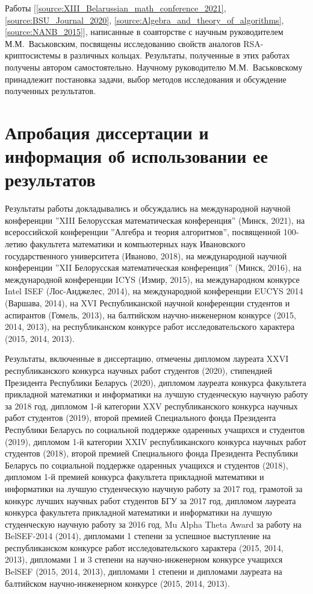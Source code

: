 \documentclass[_00_dissertation.tex]{subfiles}
\begin{document}
Работы [\ref{source:XIII_Belarussian_math_conference_2021}, \ref{source:BSU_Journal_2020}, \ref{source:Algebra_and_theory_of_algorithms}, \ref{source:NANB_2015}], написанные в соавторстве с научным руководителем М.М.~Васьковским, посвящены исследованию свойств аналогов RSA-криптосистемы в различных кольцах.
Результаты, полученные  в этих работах получены  автором самостоятельно.
Научному руководителю М.М.~Васьковскому принадлежит постановка задачи, выбор методов исследования и обсуждение полученных результатов.

\section*{Апробация диссертации и информация об использовании ее результатов}

Результаты работы докладывались и обсуждались на международной научной конференции ''XIII Белорусская математическая конференция'' (Минск, 2021), на всероссийской конференции ''Алгебра и теория алгоритмов'', посвященной 100-летию факультета математики и компьютерных наук Ивановского государственного университета (Иваново, 2018), на международной научной конференции ''XII Белорусская математическая конференция'' (Минск, 2016), на международной конференции ICYS (Измир, 2015), на международном конкурсе Intel ISEF (Лос-Анджелес, 2014), на международной конференции EUCYS 2014 (Варшава, 2014), на XVI Республиканской научной конференции студентов и аспирантов (Гомель, 2013), на балтийском научно-инженерном конкурсе (2015, 2014, 2013), на республиканском конкурсе работ исследовательского характера (2015, 2014, 2013).

Результаты, включенные в диссертацию, отмечены дипломом лауреата XXVI республиканского конкурса научных работ студентов (2020), стипендией Президента Республики Беларусь (2020), дипломом лауреата конкурса факультета прикладной математики и информатики на лучшую студенческую научную работу за 2018 год, дипломом 1-й категории XXV республиканского конкурса научных работ студентов (2019), второй премией Специального фонда Президента Республики Беларусь по социальной поддержке одаренных учащихся и студентов (2019), дипломом 1-й категории XXIV республиканского конкурса научных работ студентов (2018), второй премией Специального фонда Президента Республики Беларусь по социальной поддержке одаренных учащихся и студентов (2018), дипломом 1-й премией конкурса факультета прикладной математики и информатики на лучшую студенческую научную работу за 2017 год, грамотой за конкурс лучших научных работ студентов БГУ за 2017 год, дипломом лауреата конкурса факультета прикладной математики и информатики на лучшую студенческую научную работу за 2016 год, Mu Alpha Theta Award за работу на BelSEF-2014 (2014), дипломами 1 степени за успешное выступление на республиканском конкурсе работ исследовательского характера (2015, 2014, 2013), дипломами 1 и 3 степени на научно-инженерном конкурсе учащихся BelSEF (2015, 2014, 2013), дипломами 1 степени и дипломами лауреата на балтийском научно-инженерном конкурсе (2015, 2014, 2013).
\end{document}
